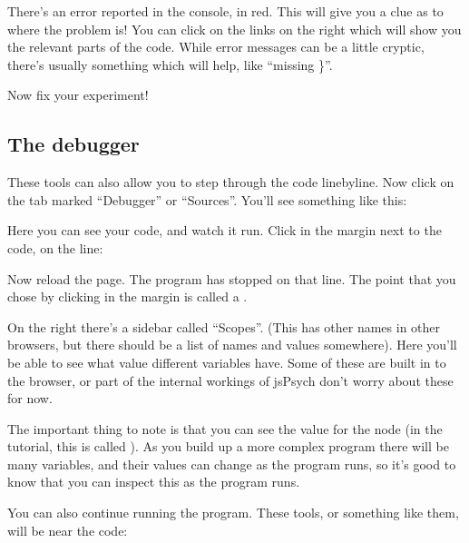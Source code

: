 \documentclass[letterpaper,10pt,english]{sphinxmanual}
\begin{document}
There’s an error reported in the console, in red. This will give you a clue as
to where the problem is! You can click on the links on the right which will show
you the relevant parts of the code. While error messages can be a little cryptic,
there’s usually something which will help, like “missing \}”.

Now fix your experiment!


\subsection{The debugger}
\label{\detokenize{jspsych_au:the-debugger}}
These tools can also allow you to step through the code line\sphinxhyphen{}by\sphinxhyphen{}line. Now click
on the tab marked “Debugger” or “Sources”. You’ll see something like this:

\noindent{}

Here you can see your code, and watch it run. Click in the margin next to the code,
on the line:

\begin{sphinxVerbatim}[commandchars=\\\{\}]
\end{sphinxVerbatim}

Now reload the page. The program has stopped on that line. The point that you chose
by clicking in the margin is called a .

\noindent{}

On the right there’s a sidebar called “Scopes”. (This has other names in other browsers,
but there should be a list of names and values somewhere). Here you’ll be able to see what
value different variables have. Some of these are built in to the browser, or part of the
internal workings of jsPsych \textendash{} don’t worry about these for now.

The important thing to note is that you can see the value for the node (in the tutorial,
this is called ). As you build up a more complex program there will be
many variables, and their values can change as the program runs, so it’s good
to know that you can inspect this as the program runs.

You can also continue running the program. These tools, or something like them, will be
near the code:
\end{document}
